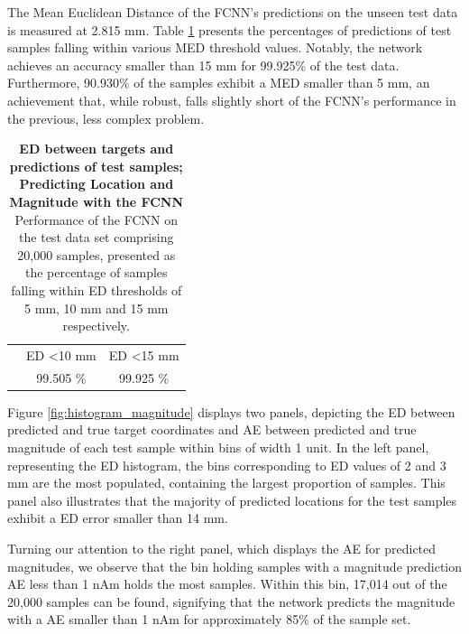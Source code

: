\documentclass[a4paper, UKenglish, 11pt]{uiomaster}
\begin{document}
The Mean Euclidean Distance of the FCNN's predictions on the unseen test data is measured at 2.815 mm. Table \ref{table:MED_magnitude} presents the percentages of predictions of test samples falling within various MED threshold values. Notably, the network achieves an accuracy smaller than 15 mm for 99.925$\%$ of the test data. Furthermore, 90.930$\%$ of the samples exhibit a MED smaller than 5 mm, an achievement that, while robust, falls slightly short of the FCNN's performance in the previous, less complex problem.

\begin{table}[]
  \centering
\begin{tabular}{|ccc|}
\hline
\rowcolor[HTML]{CBCEFB}
\multicolumn{3}{|c|}{\cellcolor[HTML]{CBCEFB}\textbf{Euclidean Distance for Test Samples}}                                                             \\ \hline
\rowcolor[HTML]{EFEFEF}
\multicolumn{1}{|c|}{\cellcolor[HTML]{EFEFEF}ED \textless 5 mm} & \multicolumn{1}{c|}{\cellcolor[HTML]{EFEFEF}ED \textless 10 mm} & ED \textless 15 mm \\ \hline
\rowcolor[HTML]{FFFFFF}
\multicolumn{1}{|c|}{\cellcolor[HTML]{FFFFFF}90.930 $\%$}       & \multicolumn{1}{c|}{\cellcolor[HTML]{FFFFFF}99.505 $\%$}        & 99.925 $\%$        \\ \hline
\end{tabular}
\caption{\textbf{ED between targets and predictions of test samples; Predicting Location and Magnitude with the FCNN} \newline
Performance of the FCNN on the test data set comprising 20,000 samples, presented as the percentage of samples falling within ED thresholds of 5 mm, 10 mm and 15 mm respectively.}
\label{table:MED_magnitude}
\end{table}

Figure \ref{fig:histogram_magnitude} displays two panels, depicting the ED between predicted and true target coordinates and AE between predicted and true magnitude of each test sample within bins of width 1 unit. In the left panel, representing the ED histogram, the bins corresponding to ED values of 2 and 3 mm are the most populated, containing the largest proportion of samples. This panel also illustrates that the majority of predicted locations for the test samples exhibit a ED error smaller than 14 mm.

Turning our attention to the right panel, which displays the AE for predicted magnitudes, we observe that the bin holding samples with a magnitude prediction AE less than 1 nAm holds the most samples. Within this bin, 17,014 out of the 20,000 samples can be found, signifying that the network predicts the magnitude with a AE smaller than 1 nAm for approximately 85$\%$ of the sample set.
\end{document}
